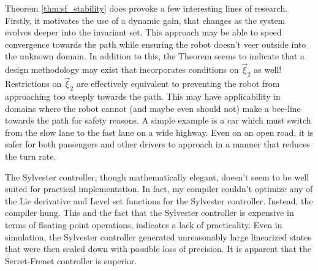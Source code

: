 \documentclass[oneside, 11pt]{book}
\begin{document}
Theorem \ref{thm:sf_stability} does provoke a few interesting lines of research. Firstly, it motivates the use of a dynamic gain, that changes as the system evolves deeper into the invariant set. This approach may be able to speed convergence towards the path while ensuring the robot doesn't veer outside into the unknown domain. In addition to this, the Theorem seems to indicate that a design methodology may exist that incorporates conditions on $\vec{\xi}_2$ as well! Restrictions on $\vec{\xi}_2$ are effectively equivalent to preventing the robot from approaching too steeply towards the path. This may have applicability in domains where the robot cannot (and maybe even should not) make a bee-line towards the path for safety reasons. A simple example is a car which must switch from the slow lane to the fast lane on a wide highway. Even on an open road, it is safer for both passengers and other drivers to approach in a manner that reduces the turn rate.

The Sylvester controller, though mathematically elegant, doesn't seem to be well suited for practical implementation. In fact, my compiler couldn't optimize any of the Lie derivative and Level set functions for the Sylvester controller. Instead, the compiler hung. This and the fact that the Sylvester controller is expensive in terms of floating point operations, indicates a lack of practicality. Even in simulation, the Sylvester controller generated unreasonably large linearized states that were then scaled down with possible loss of precision. It is apparent that the Serret-Frenet controller is superior.

\backmatter
\cleardoublepage
{}
{}
\printbibliography[title=References]

\cleardoublepage
{}
{}
\printindex
\end{document}
